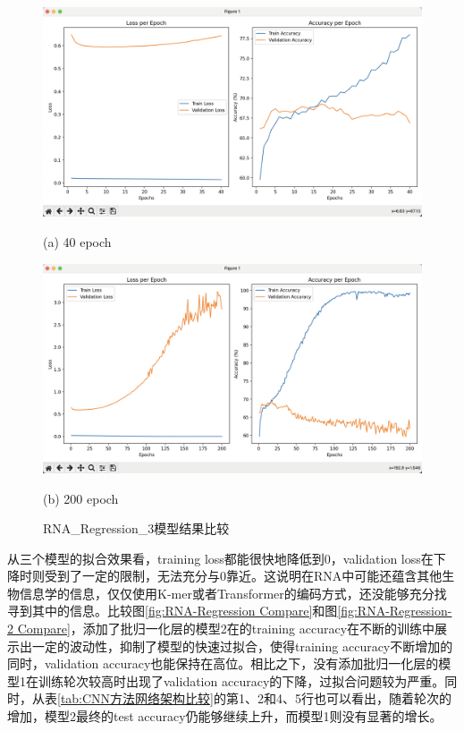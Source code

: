 \documentclass[a4paper,11pt,AutoFakeBold]{ctexart}
\begin{document}
\begin{figure}[h]
    \centering
    \begin{minipage}{0.49\linewidth}
        \centering
        \includegraphics[height=0.55\linewidth]{Figures/3-40.png}
        \caption*{(a) 40 epoch}
    \end{minipage}
    \begin{minipage}{0.49\linewidth}
        \centering
        \includegraphics[height=0.55\linewidth]{Figures/3-200.png}
        \caption*{(b) 200 epoch}
    \end{minipage}
    \caption{RNA\_Regression\_3模型结果比较}
    \label{fig:RNA-Regression-3 Compare}
\end{figure}

从三个模型的拟合效果看，training loss都能很快地降低到0，validation loss在下降时则受到了一定的限制，无法充分与0靠近。这说明在RNA中可能还蕴含其他生物信息学的信息，仅仅使用K-mer或者Transformer的编码方式，还没能够充分找寻到其中的信息。比较图\ref{fig:RNA-Regression Compare}和图\ref{fig:RNA-Regression-2 Compare}，添加了批归一化层的模型2在的training accuracy在不断的训练中展示出一定的波动性，抑制了模型的快速过拟合，使得training accuracy不断增加的同时，validation accuracy也能保持在高位。相比之下，没有添加批归一化层的模型1在训练轮次较高时出现了validation accuracy的下降，过拟合问题较为严重。同时，从表\ref{tab:CNN方法网络架构比较}的第1、2和4、5行也可以看出，随着轮次的增加，模型2最终的test accuracy仍能够继续上升，而模型1则没有显著的增长。
\end{document}
